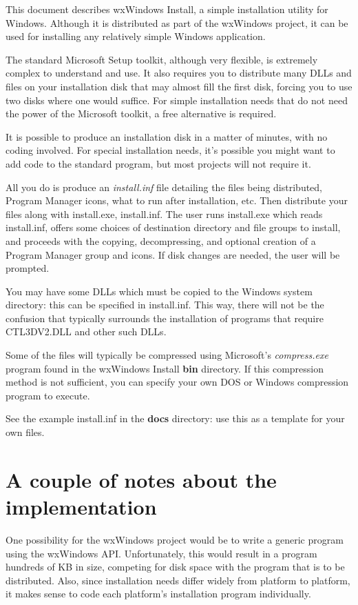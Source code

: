 This document describes wxWindows Install, a simple installation
utility for Windows. Although it is distributed as part of the
wxWindows project, it can be used for installing any relatively
simple Windows application.

The standard Microsoft Setup toolkit, although very flexible, is extremely
complex to understand and use. It also requires you to distribute many
DLLs and files on your installation disk that may almost fill the first
disk, forcing you to use two disks where one would suffice. For simple
installation needs that do not need the power of the Microsoft toolkit,
a free alternative is required.

It is possible to produce an installation disk in a matter of
minutes, with no coding involved. For special installation needs,
it's possible you might want to add code to the standard
program, but most projects will not require it.

All you do is produce an {\it install.inf} file detailing the files
being distributed, Program Manager icons, what to run after
installation, etc. Then distribute your files along with install.exe,
install.inf. The user runs install.exe which reads install.inf, offers
some choices of destination directory and file groups to install, and
proceeds with the copying, decompressing, and optional creation of a
Program Manager group and icons. If disk changes are needed, the
user will be prompted.

You may have some DLLs which must be copied to the Windows
system directory: this can be specified in install.inf.
This way, there will not be the confusion that typically
surrounds the installation of programs that require CTL3DV2.DLL
and other such DLLs.

Some of the files will typically be compressed using Microsoft's {\it
compress.exe} program found in the wxWindows Install {\bf bin}\rtfsp
directory. If this compression method is not sufficient, you can
specify your own DOS or Windows compression program to execute.

See the example install.inf in the {\bf docs} directory: use this as a
template for your own files.

\section{A couple of notes about the implementation}

One possibility for the wxWindows project would be to write a generic
program using the wxWindows API. Unfortunately, this would result in a
program hundreds of KB in size, competing for disk space with the
program that is to be distributed. Also, since installation needs differ
widely from platform to platform, it makes sense to code each platform's
installation program individually.

